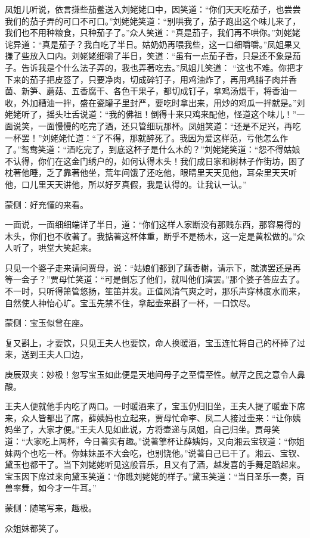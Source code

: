 \begin{parag}
凤姐儿听说，依言搛些茄鲝送入刘姥姥口中，因笑道：“你们天天吃茄子，也尝尝我们的茄子弄的可口不可口。”刘姥姥笑道：“别哄我了，茄子跑出这个味儿来了，我们也不用种粮食，只种茄子了。”众人笑道：“真是茄子，我们再不哄你。”刘姥姥诧异道：“真是茄子？我白吃了半日。姑奶奶再喂我些，这一口细嚼嚼。”凤姐果又搛了些放入口内。刘姥姥细嚼了半日，笑道：“虽有一点茄子香，只是还不象是茄子。告诉我是个什么法子弄的，我也弄著吃去。”凤姐儿笑道： “这也不难。你把才下来的茄子把皮签了，只要净肉，切成碎钉子，用鸡油炸了，再用鸡脯子肉并香菌、新笋、蘑菇、五香腐干、各色干果子，都切成钉子，拿鸡汤煨干，将香油一收，外加糟油一拌，盛在瓷罐子里封严，要吃时拿出来，用炒的鸡瓜一拌就是。”刘姥姥听了，摇头吐舌说道：“我的佛祖！倒得十来只鸡来配他，怪道这个味儿！”一面说笑，一面慢慢的吃完了酒，还只管细玩那杯。凤姐笑道：“还是不足兴，再吃一杯罢！”刘姥姥忙道：“了不得，那就醉死了。我因为爱这样范，亏他怎么作了。”鸳鸯笑道：“酒吃完了，到底这杯子是什么木的？”刘姥姥笑道：“怨不得姑娘不认得，你们在这金门绣户的，如何认得木头！我们成日家和树林子作街坊，困了枕著他睡，乏了靠著他坐，荒年间饿了还吃他，眼睛里天天见他，耳朵里天天听他，口儿里天天讲他，所以好歹真假，我是认得的。让我认一认。”\begin{note}蒙侧：好充懂的来看。\end{note}一面说，一面细细端详了半日，道：“你们这样人家断没有那贱东西，那容易得的木头，你们也不收著了。我掂著这杯体重，断乎不是杨木，这一定是黄松做的。”众人听了，哄堂大笑起来。
\end{parag}


\begin{parag}
    只见一个婆子走来请问贾母，说：“姑娘们都到了藕香榭，请示下，就演罢还是再等一会子？”贾母忙笑道：“可是倒忘了他们，就叫他们演罢。”那个婆子答应去了。不一时，只听得箫管悠扬，笙笛并发。正值风清气爽之时，那乐声穿林度水而来，自然使人神怡心旷。宝玉先禁不住，拿起壶来斟了一杯，一口饮尽。\begin{note}蒙侧：宝玉似曾在座。\end{note}复又斟上，才要饮，只见王夫人也要饮，命人换暖酒，宝玉连忙将自己的杯捧了过来，送到王夫人口边，\begin{note}庚辰双夹：妙极！忽写宝玉如此便是天地间母子之至情至性。献芹之民之意令人鼻酸。\end{note}王夫人便就他手内吃了两口。一时暖酒来了，宝玉仍归旧坐，王夫人提了暖壶下席来，众人皆都出了席，薛姨妈也立起来，贾母忙命李、凤二人接过壶来：“让你姨妈坐了，大家才便。”王夫人见如此说，方将壶递与凤姐，自己归坐。贾母笑道：“大家吃上两杯，今日著实有趣。”说著擎杯让薛姨妈，又向湘云宝钗道：“你姐妹两个也吃一杯。你妹妹虽不大会吃，也别饶他。”说著自己已干了。湘云、宝钗、黛玉也都干了。当下刘姥姥听见这般音乐，且又有了酒，越发喜的手舞足蹈起来。宝玉因下席过来向黛玉笑道：“你瞧刘姥姥的样子。”黛玉笑道：“当日圣乐一奏，百兽率舞，如今才一牛耳。”\begin{note}蒙侧：随笔写来，趣极。\end{note}众姐妹都笑了。
\end{parag}


